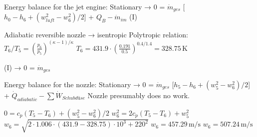 Energy balance for the jet engine:  
Stationary → 0 = \( \dot{m}_{ges} \) [\( h_0 - h_6 + (w_{luft}^2 - w_6^2)/2 \)] + \( Q_B - \dot{m}_{im} \) (I)  

Adiabatic reversible nozzle → isentropic  
Polytropic relation:  
\( T_6/T_5 = \left( \frac{p_6}{p_5} \right)^{(\kappa - 1)/\kappa} \)  
\( T_6 = 431.9 \cdot \left( \frac{0.191}{0.5} \right)^{0.4/1.4} = 328.75 \, \text{K} \)  

(I) → 0 = \( \dot{m}_{ges} \)  

Energy balance for the nozzle:  
Stationary → 0 = \( \dot{m}_{ges} \) [\( h_5 - h_6 + (w_5^2 - w_6^2)/2 \)] + \( \dot{Q}_{adiabatic} - \sum \dot{W}_{Schubdüse} \)  
Nozzle presumably does no work.  

\( 0 = c_p (T_5 - T_6) + (w_5^2 - w_6^2)/2 \)  
\( w_6^2 = 2 c_p (T_5 - T_6) + w_5^2 \)  
\( w_6 = \sqrt{2 \cdot 1.006 \cdot (431.9 - 328.75) \cdot 10^3 + 220^2} \)  
\( w_6 = 457.29 \, \text{m/s} \)  
\( w_6 = 507.24 \, \text{m/s} \)